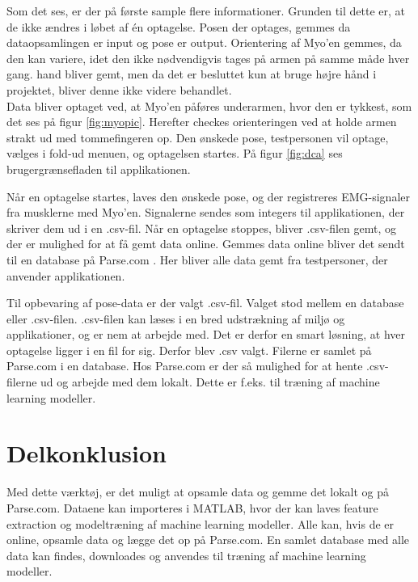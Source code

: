 Som det ses, er der på første sample flere informationer. Grunden til dette er, at de ikke ændres i løbet af én optagelse. Posen der optages, gemmes da dataopsamlingen er input og pose er output. Orientering af Myo'en gemmes, da den kan variere, idet den ikke nødvendigvis tages på armen på samme måde hver gang. hand bliver gemt, men da det er besluttet kun at bruge højre hånd i projektet, bliver denne ikke videre behandlet.\\
Data bliver optaget ved, at Myo'en påføres underarmen, hvor den er tykkest, som det ses på figur \ref{fig:myopic}. Herefter checkes orienteringen ved at holde armen strakt ud med tommefingeren op. Den ønskede pose, testpersonen vil optage, vælges i fold-ud menuen, og optagelsen startes. På figur \ref{fig:dca} ses brugergrænsefladen til applikationen.



Når en optagelse startes, laves den ønskede pose, og der registreres EMG-signaler fra musklerne med Myo'en. Signalerne sendes som integers til applikationen, der skriver dem ud i en .csv-fil. Når en optagelse stoppes, bliver .csv-filen gemt, og der er mulighed for at få gemt data online. Gemmes data online bliver det sendt til en database på Parse.com \citep{RefWorks:11}. Her bliver alle data gemt fra testpersoner, der anvender applikationen.

Til opbevaring af pose-data er der valgt .csv-fil. Valget stod mellem en database eller .csv-filen. .csv-filen kan læses i en bred udstrækning af miljø og applikationer, og er nem at arbejde med. Det er derfor en smart løsning, at hver optagelse ligger i en fil for sig. Derfor blev .csv valgt. Filerne er samlet på Parse.com i en database. Hos Parse.com er der så mulighed for at hente .csv-filerne ud og arbejde med dem lokalt. Dette er f.eks. til træning af machine learning modeller.

\section{Delkonklusion}
Med dette værktøj, er det muligt at opsamle data og gemme det lokalt og på Parse.com. Dataene kan importeres i MATLAB, hvor der kan laves feature extraction og modeltræning af machine learning modeller. Alle kan, hvis de er online, opsamle data og lægge det op på Parse.com. En samlet database med alle data kan findes, downloades og anvendes til træning af machine learning modeller.